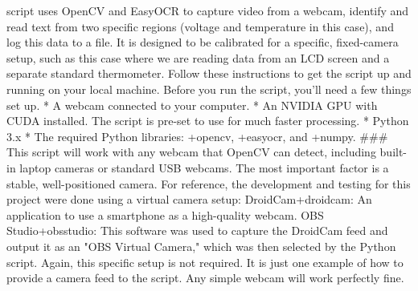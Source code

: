 \markdownRendererDocumentBegin
\This script uses OpenCV and EasyOCR to capture video from a webcam, identify and read text from two specific regions (voltage and temperature in this case), and log this data to a file.\markdownRendererInterblockSeparator
{}It is designed to be calibrated for a specific, fixed-camera setup, such as this case where we are reading data from an LCD screen and a separate standard thermometer.\markdownRendererInterblockSeparator
{}\markdownRendererSectionBegin
\markdownRendererSectionBegin
{}\markdownRendererInterblockSeparator
{}Follow these instructions to get the script up and running on your local machine.\markdownRendererInterblockSeparator
{}\markdownRendererSectionBegin
{}\markdownRendererInterblockSeparator
{}Before you run the script, you'll need a few things set up.\markdownRendererInterblockSeparator
{} * A webcam connected to your computer. *  An NVIDIA GPU with CUDA installed. The script is pre-set to use  for much faster processing.\markdownRendererInterblockSeparator
{} * Python 3.x * The required Python libraries: +{}{}{opencv}, +{}{}{easyocr}, and +{}{}{numpy}.\markdownRendererInterblockSeparator
{}###  This script will work with any webcam that OpenCV can detect, including built-in laptop cameras or standard USB webcams. The most important factor is a stable, well-positioned camera.\markdownRendererInterblockSeparator
{}For reference, the development and testing for this project were done using a virtual camera setup:\markdownRendererInterblockSeparator
{}\markdownRendererUlBegin
\markdownRendererUlItem DroidCam+{}{}{droidcam}: An application to use a smartphone as a high-quality webcam.\markdownRendererUlItemEnd 
\markdownRendererUlItem OBS Studio+{}{}{obsstudio}: This software was used to capture the DroidCam feed and output it as an "OBS Virtual Camera," which was then selected by the Python script.\markdownRendererUlItemEnd 
\markdownRendererUlEnd \markdownRendererInterblockSeparator
{}Again, this specific setup is not required. It is just one example of how to provide a camera feed to the script. Any simple webcam will work perfectly fine.\markdownRendererInterblockSeparator
